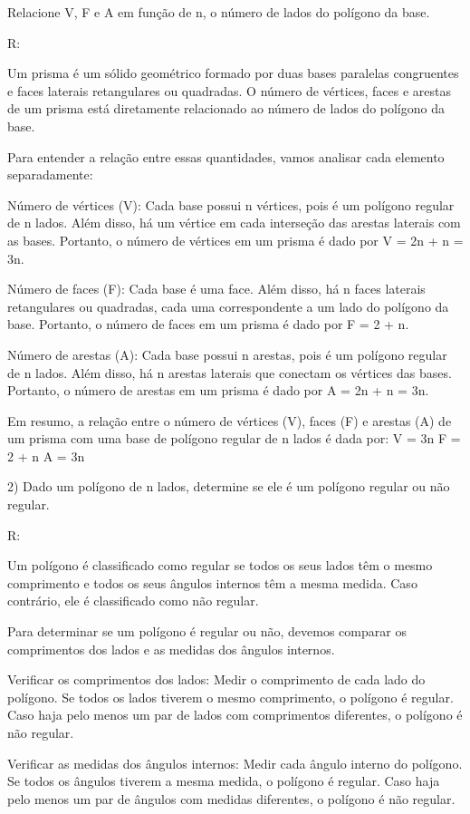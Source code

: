 Relacione V, F e A em função de n, o número de lados do polígono da
base.

R:

Um prisma é um sólido geométrico formado por duas bases paralelas
congruentes e faces laterais retangulares ou quadradas. O número de
vértices, faces e arestas de um prisma está diretamente relacionado ao
número de lados do polígono da base.

Para entender a relação entre essas quantidades, vamos analisar cada
elemento separadamente:

Número de vértices (V): Cada base possui n vértices, pois é um polígono
regular de n lados. Além disso, há um vértice em cada interseção das
arestas laterais com as bases. Portanto, o número de vértices em um
prisma é dado por V = 2n + n = 3n.

Número de faces (F): Cada base é uma face. Além disso, há n faces
laterais retangulares ou quadradas, cada uma correspondente a um lado do
polígono da base. Portanto, o número de faces em um prisma é dado por F
= 2 + n.

Número de arestas (A): Cada base possui n arestas, pois é um polígono
regular de n lados. Além disso, há n arestas laterais que conectam os
vértices das bases. Portanto, o número de arestas em um prisma é dado
por A = 2n + n = 3n.

Em resumo, a relação entre o número de vértices (V), faces (F) e arestas
(A) de um prisma com uma base de polígono regular de n lados é dada por:
V = 3n F = 2 + n A = 3n

2) Dado um polígono de n lados, determine se ele é um polígono regular
ou não regular.

R:

Um polígono é classificado como regular se todos os seus lados têm o
mesmo comprimento e todos os seus ângulos internos têm a mesma medida.
Caso contrário, ele é classificado como não regular.

Para determinar se um polígono é regular ou não, devemos comparar os
comprimentos dos lados e as medidas dos ângulos internos.

Verificar os comprimentos dos lados: Medir o comprimento de cada lado do
polígono. Se todos os lados tiverem o mesmo comprimento, o polígono é
regular. Caso haja pelo menos um par de lados com comprimentos
diferentes, o polígono é não regular.

Verificar as medidas dos ângulos internos: Medir cada ângulo interno do
polígono. Se todos os ângulos tiverem a mesma medida, o polígono é
regular. Caso haja pelo menos um par de ângulos com medidas diferentes,
o polígono é não regular.

